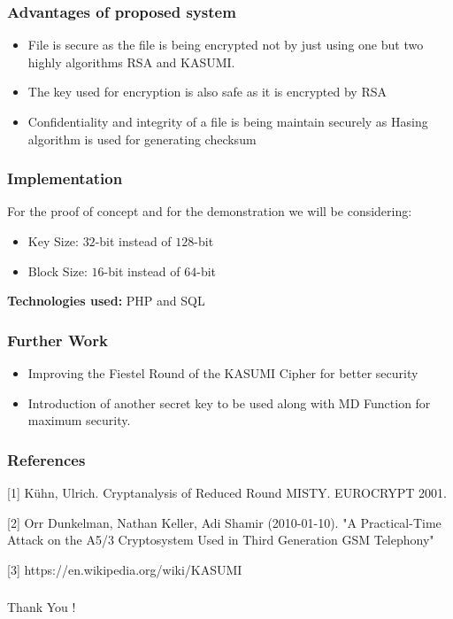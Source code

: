 \documentclass{beamer}
\begin{document}
\begin{frame}[t]
	\frametitle{Advantages of proposed system}
	\begin{itemize}
		\item File is secure as the file is being encrypted not by just using one but two highly algorithms RSA and KASUMI. 
		\item The key used for encryption is also safe as it is encrypted by RSA
		\item Confidentiality and integrity of a file is being maintain securely as Hasing algorithm is used for generating checksum 
	\end{itemize}
\end{frame}

\begin{frame}[t]
	\frametitle{Implementation}
	For the proof of concept and for the demonstration we will be considering:
	\begin{itemize}
		\item Key Size: $32$-bit instead of $128$-bit
		\item Block Size: $16$-bit instead of $64$-bit
	\end{itemize}
\vspace{0.5in}
\textbf{Technologies used: } PHP and SQL
\end{frame}

\begin{frame}
	\frametitle{Further Work}
	\begin{itemize}
		\item Improving the Fiestel Round of the KASUMI Cipher for better security
		\item Introduction of another secret key to be used along with MD Function for maximum security.
	\end{itemize}
\end{frame}

\begin{frame}[t]
	\frametitle{References}
	[1] Kühn, Ulrich. Cryptanalysis of Reduced Round MISTY. EUROCRYPT 2001.

	[2] Orr Dunkelman, Nathan Keller, Adi Shamir (2010-01-10). "A Practical-Time Attack on the A5/3 Cryptosystem Used in Third Generation GSM Telephony"
	
	[3] https://en.wikipedia.org/wiki/KASUMI
	
\end{frame}

\begin{frame}
	\frametitle{}
	\center \Large Thank You !
\end{frame}
\end{document}
